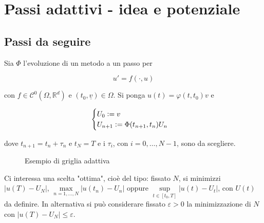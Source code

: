 \documentclass[hidelinks, 10pt]{report}
\begin{document}
\section{Passi adattivi - idea e potenziale}	\label{section:16}
\subsection{Passi da seguire}

Sia $ \Phi $ l'evoluzione di un metodo a un passo per

\[ u' = f(\cdot, u) \]

con $ f \in \mathcal{C}^{0} (\Omega, \mathbb{R}^{d}) $ e $ (t_{0}, \underline{v}) \in \Omega $. Si ponga $ u(t) = \varphi(t, t_{0}) v $ e

\[
\begin{cases}
U_{0} \vcentcolon= v \\
U_{n + 1} \vcentcolon= \Phi(t_{n + 1}, t_{n}) U_{n}
\end{cases}
\]

dove $ t_{n + 1} = t_{n} + \tau_{n} $ e  $ t_{N} = T $ e i $ \tau_{i} $, con $ i = 0, \dotsc, N - 1 $, sono da scegliere.

\begin{figure}[H]
\begin{center}

\caption{Esempio di griglia adattiva}
\end{center}
\end{figure}

Ci interessa una scelta "ottima", cio\`e del tipo: fissato $ N $, si minimizzi $ {\vert u(T) - U_{N} \vert} $, $ {\max\limits_{n = 1, \dotsc, N} \vert u(t_{n}) - U_{n} \vert } $ oppure $ { \sup\limits_{t \in [t_{0}, T]} \vert u(t) - U_{t} \vert } $, con $ U(t) $ da definire. In alternativa si pu\`o considerare fissato $ \varepsilon > 0 $ la minimizzazione di $ N $ con $ { \vert u(T) - U_{N} \vert \le \varepsilon } $.
\end{document}
